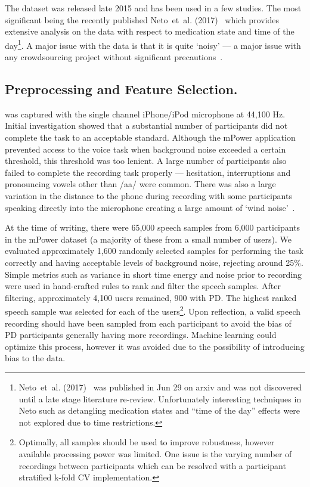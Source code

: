 \documentclass[12pt, twoside]{book}
\renewcommand\emph[1]{\textit{\color{USred}{#1}}}
\begin{document}
The dataset was released late 2015 and has been used in a few studies. The most significant being the recently published Neto~et~al. (2017)~\cite{mpowerneto2017analysis} which provides extensive analysis on the data with respect to medication state and time of the day\footnote{Neto~et~al. (2017)~\cite{mpowerneto2017analysis} was published in Jun 29 on arxiv and was not discovered until a late stage literature re-review. Unfortunately interesting techniques in Neto such as detangling medication states and ``time of the day'' effects were not explored due to time restrictions.}. A major issue with the data is that it is quite `noisy' --- a major issue with any crowdsourcing project without significant precautions~\cite{crowdsourcing}. 


\subsection{Preprocessing and Feature Selection.}
\label{mpowerprocess}
\emph{Vowel phonation} was captured with the single channel iPhone/iPod microphone at 44,100 Hz. Initial investigation showed that a substantial number of participants did not complete the task to an acceptable standard. Although the mPower application prevented access to the voice task when background noise exceeded a certain threshold, this threshold was too lenient. A large number of participants also failed to complete the recording task properly --- hesitation, interruptions and pronouncing vowels other than /aa/ were common. There was also a large variation in the distance to the phone during recording with some participants speaking directly into the microphone creating a large amount of `wind noise'~\cite{windnoise}. 

At the time of writing, there were 65,000 speech samples from 6,000 participants in the mPower dataset (a majority of these from a small number of users). We evaluated approximately 1,600 randomly selected samples for performing the task correctly and having acceptable levels of background noise, rejecting around 25\%. Simple metrics such as variance in short time energy and noise prior to recording were used in hand-crafted rules to rank and filter the speech samples. After filtering, approximately 4,100 users remained, 900 with PD. The highest ranked speech sample was selected for each of the users\footnote{Optimally, all samples should be used to improve robustness, however available processing power was limited. One issue is the varying number of recordings between participants which can be resolved with a participant stratified k-fold CV implementation.}. Upon reflection, a valid speech recording should have been sampled from each participant to avoid the bias of PD participants generally having more recordings. Machine learning could optimize this process, however it was avoided due to the possibility of introducing bias to the data. 
\end{document}
